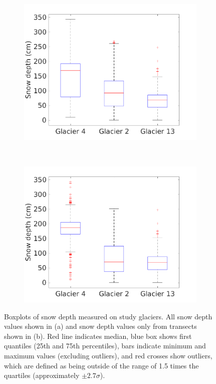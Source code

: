 \documentclass[12pt]{article}
\begin{document}
\begin{figure}[H]
    \centering
    \begin{subfigure}[b]{0.48\textwidth}
        \includegraphics[width=\textwidth]{box_depth_wZZ.png}
        \caption{ }
        \label{fig:box_depth_wZZ}
    \end{subfigure}
    ~
    \begin{subfigure}[b]{0.48\textwidth}
        \includegraphics[width=\textwidth]{box_depth_noZZ.png}
        \caption{}
        \label{fig:box_depth_noZZ}
    \end{subfigure}

    \caption{Boxplots of snow depth measured on study glaciers. All snow depth values shown in (a) and snow depth values only from transects shown in (b). Red line indicates median, blue box shows first quantiles (25th and 75th percentiles), bars indicate minimum and maximum values (excluding outliers), and red crosses show outliers, which are defined as being outside of the range of 1.5 times the quartiles (approximately $\pm2.7\sigma$).}
    \label{fig:box_depth}
\end{figure}
\end{document}
